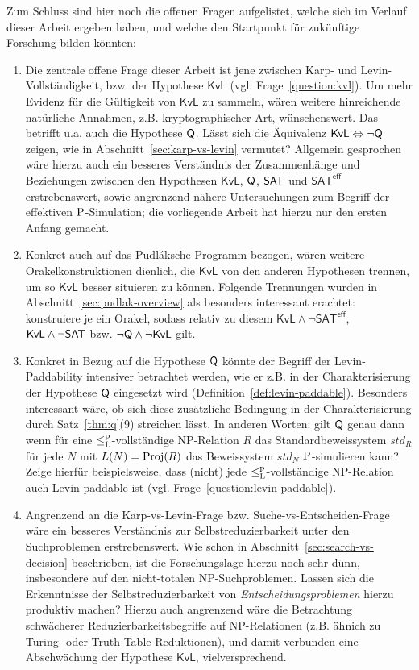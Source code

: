 Zum Schluss sind hier noch die offenen Fragen aufgelistet, welche sich im Verlauf dieser Arbeit ergeben haben, und welche den Startpunkt für zukünftige Forschung bilden könnten:
\begin{enumerate}[label=\arabic*.,midpenalty=0]
    \item Die zentrale offene Frage dieser Arbeit ist jene zwischen Karp- und Levin-Vollständigkeit, bzw. der Hypothese $\mathsf{KvL}$ (vgl. Frage~\ref{question:kvl}). Um mehr Evidenz für die Gültigkeit von $\mathsf{KvL}$ zu sammeln, wären weitere hinreichende natürliche Annahmen, z.B. kryptographischer Art, wünschenswert.
        Das betrifft u.a. auch die Hypothese $\hQ$. Lässt sich die Äquivalenz $\mathsf{KvL}\Leftrightarrow \neg\hQ$ zeigen, wie in Abschnitt~\ref{sec:karp-vs-levin} vermutet?
        Allgemein gesprochen wäre hierzu auch ein besseres Verständnis der Zusammenhänge und Beziehungen zwischen den Hypothesen $\mathsf{KvL}$, $\hQ$, $\hSAT$ und $\mathsf{SAT^{eff}}$ erstrebenswert, sowie angrenzend nähere Untersuchungen zum Begriff der effektiven $\P$-Simulation; die vorliegende Arbeit hat hierzu nur den ersten Anfang gemacht.

    \item Konkret auch auf das Pudláksche Programm bezogen, wären weitere Orakelkonstruktionen dienlich, die $\mathsf{KvL}$ von den anderen Hypothesen trennen, um so $\mathsf{KvL}$ besser situieren zu können. Folgende Trennungen wurden in Abschnitt~\ref{sec:pudlak-overview} als besonders interessant erachtet: konstruiere je ein Orakel, sodass relativ zu diesem $\mathsf{KvL}\land\neg\mathsf{SAT^{eff}}$, $\mathsf{KvL}\land\neg\hSAT$ bzw. $\neg\hQ\land\neg\mathsf{KvL}$ gilt.
    \item Konkret in Bezug auf die Hypothese $\hQ$ könnte der Begriff der Levin-Paddability intensiver betrachtet werden, wie er z.B. in der Charakterisierung der Hypothese $\hQ$ eingesetzt wird (Definition~\ref{def:levin-paddable}). Besonders interessant wäre, ob sich diese zusätzliche Bedingung in der Charakterisierung durch Satz~\ref{thm:q}(9) streichen lässt. In anderen Worten: gilt $\hQ$ genau dann wenn für eine $\leqlp$-vollständige NP-Relation $R$ das Standardbeweissystem $\mathit{std}_R$ für jede $N$ mit $L(N)=\Proj(R)$ das Beweissystem $\mathit{std}_N$ $\P$-simulieren kann?
        Zeige hierfür beispielsweise, dass (nicht) jede $\leqlp$-vollständige NP-Relation auch Levin-paddable ist (vgl. Frage~\ref{question:levin-paddable}).
    \item Angrenzend an die Karp-vs-Levin-Frage bzw. Suche-vs-Entscheiden-Frage wäre ein besseres Verständnis zur Selbstreduzierbarkeit unter den Suchproblemen erstrebenswert. Wie schon in Abschnitt~\ref{sec:search-vs-decision} beschrieben, ist die Forschungslage hierzu noch sehr dünn, insbesondere auf den nicht-totalen NP-Suchproblemen. Lassen sich die Erkenntnisse der Selbstreduzierbarkeit von \emph{Entscheidungsproblemen} hierzu produktiv machen? Hierzu auch angrenzend wäre die Betrachtung schwächerer Reduzierbarkeitsbegriffe auf NP-Relationen (z.B. ähnich zu Turing- oder Truth-Table-Reduktionen), und damit verbunden eine Abschwächung der Hypothese $\mathsf{KvL}$, vielversprechend.
\end{enumerate}
